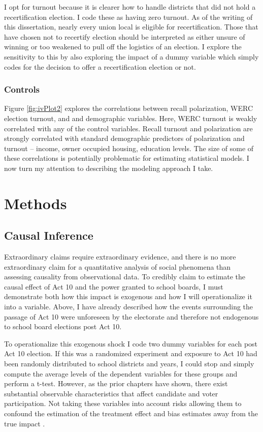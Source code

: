 I opt for turnout because it is clearer how to handle districts that did not 
hold a recertification election. I code these as having zero turnout. As of the 
writing of this dissertation, nearly every union local is eligible for recertification. 
Those that have chosen not to recertify election should be interpreted as either unsure of winning or too weakened to pull off the logistics of an election. I 
explore the sensitivity to this by also exploring the impact of a dummy variable 
which simply codes for the decision to offer a recertification election or not. 

\subsubsection{Controls}

Figure \ref{fig:ivPlot2} explores the correlations between recall polarization, 
WERC election turnout, and and demographic variables. Here, WERC turnout is weakly 
correlated with any of the control variables. Recall turnout and polarization 
are strongly correlated with standard demographic predictors of polarization and 
turnout -- income, owner occupied housing, education levels. The size of some 
of these correlations is potentially problematic for estimating statistical models. 
I now turn my attention to describing the modeling approach I take. 




\section{Methods}

\subsection{Causal Inference}

Extraordinary claims require extraordinary evidence, and there is no more 
extraordinary claim for a quantitative analysis of social phenomena than 
assessing causality from observational data. To credibly claim to estimate the causal effect of Act 10 
and the power granted to school boards, I must demonstrate both how this impact 
is exogenous and how I will operationalize it into a variable. Above, I have 
already described how the events surrounding the passage of Act 10 were 
unforeseen by the electorate and therefore not endogenous to school board 
elections post Act 10. 

To operationalize this exogenous shock I code two dummy variables for each post 
Act 10 election. If 
this was a randomized experiment and exposure to Act 10 had been randomly 
distributed to school districts and years, I could stop and simply compute 
the average levels of the dependent variables for these groups and perform 
a t-test. However, as the prior chapters have shown, there exist substantial observable characteristics that affect candidate and voter participation. Not 
taking these variables into account risks allowing them to confound the 
estimation of the treatment effect and bias estimates away from the true 
impact \cite{gelhill}. 

